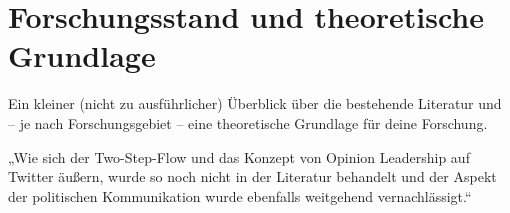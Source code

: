 
\section{Forschungsstand und theoretische Grundlage}
\label{sec:forschungsstand-und-theoretische-grundlage}



Ein kleiner (nicht zu ausführlicher) Überblick über die bestehende
Literatur und – je nach Forschungsgebiet – eine theoretische Grundlage
für deine Forschung.


„Wie sich der Two-Step-Flow und das Konzept von Opinion
Leadership auf Twitter äußern, wurde so noch nicht in der Literatur
behandelt und der Aspekt der politischen Kommunikation wurde ebenfalls
weitgehend vernachlässigt.“


